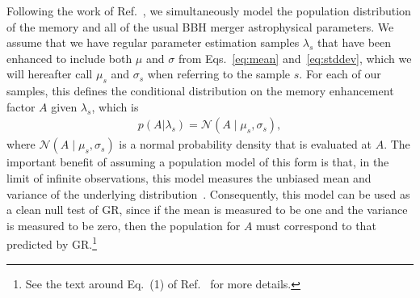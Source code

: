 \documentclass[aps,prd,reprint,twocolumn,10pt,eqsecnum,showpacs,nofootinbib,amsfonts,amssymb,amsmath,longbibliography,superscriptaddress,floatfix]{revtex4-1}
\begin{document}
Following the work of Ref.~\cite{Payne:2023kwj}, we simultaneously model the population distribution of the memory and all of the usual BBH merger astrophysical parameters. We assume that we have regular parameter estimation samples $\lambda_{s}$ that have been enhanced to include both $\mu$ and $\sigma$ from Eqs.~\eqref{eq:mean} and~\eqref{eq:stddev}, which we will hereafter call $\mu_{s}$ and $\sigma_{s}$ when referring to the sample $s$. For each of our samples, this defines the conditional distribution on the memory enhancement factor $A$ given $\lambda_{s}$, which is
\begin{align}
	\label{eq:Aconditionaldistribution}
	p(A|\lambda_{s})=\mathcal{N}(A \mid \mu_{s},\sigma_{s}),
\end{align}
where $\mathcal{N}(A \mid \mu_{s}, \sigma_{s})$ is a normal probability density that is evaluated at $A$. The important benefit of assuming a population model of this form is that, in the limit of infinite observations, this model measures the unbiased mean and variance of the underlying distribution~\cite{gelman2013bayesian}. Consequently, this model can be used as a clean null test of GR, since if the mean is measured to be one and the variance is measured to be zero, then the population for $A$ must correspond to that predicted by GR.\footnote{See the text around Eq.~(1) of Ref.~\cite{LIGOScientific:2020tif} for more details.}
\end{document}
